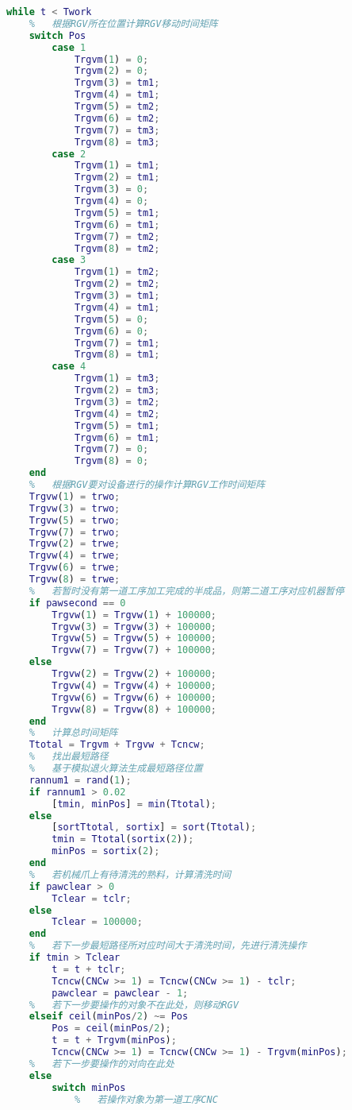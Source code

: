 \documentclass[no-math,withoutpreface,bwprint]{cumcmthesis} %
\numberwithin{equation}{section}
\numberwithin{figure}{section}
\numberwithin{table}{section}
\begin{document}
\begin{lstlisting}[language=matlab]
while t < Twork
    %   根据RGV所在位置计算RGV移动时间矩阵
    switch Pos
        case 1
            Trgvm(1) = 0;
          	Trgvm(2) = 0;
            Trgvm(3) = tm1;
           	Trgvm(4) = tm1;
         	Trgvm(5) = tm2;
           	Trgvm(6) = tm2;
          	Trgvm(7) = tm3;
           	Trgvm(8) = tm3;
       	case 2
           	Trgvm(1) = tm1;
           	Trgvm(2) = tm1;
         	Trgvm(3) = 0;
          	Trgvm(4) = 0;
           	Trgvm(5) = tm1;
          	Trgvm(6) = tm1;
           	Trgvm(7) = tm2;
           	Trgvm(8) = tm2;               
        case 3
           	Trgvm(1) = tm2;
          	Trgvm(2) = tm2;
          	Trgvm(3) = tm1;
         	Trgvm(4) = tm1;
          	Trgvm(5) = 0;
           	Trgvm(6) = 0;
          	Trgvm(7) = tm1;
           	Trgvm(8) = tm1;
     	case 4
         	Trgvm(1) = tm3;
          	Trgvm(2) = tm3;
           	Trgvm(3) = tm2;
          	Trgvm(4) = tm2;
           	Trgvm(5) = tm1;
          	Trgvm(6) = tm1;
        	Trgvm(7) = 0;
           	Trgvm(8) = 0;        
    end
    %   根据RGV要对设备进行的操作计算RGV工作时间矩阵
    Trgvw(1) = trwo;
	Trgvw(3) = trwo;
    Trgvw(5) = trwo;
	Trgvw(7) = trwo;
	Trgvw(2) = trwe;
	Trgvw(4) = trwe;
	Trgvw(6) = trwe;
	Trgvw(8) = trwe;
    %   若暂时没有第一道工序加工完成的半成品，则第二道工序对应机器暂停
    if pawsecond == 0
        Trgvw(1) = Trgvw(1) + 100000;
        Trgvw(3) = Trgvw(3) + 100000;
        Trgvw(5) = Trgvw(5) + 100000;
        Trgvw(7) = Trgvw(7) + 100000;
    else
        Trgvw(2) = Trgvw(2) + 100000;
        Trgvw(4) = Trgvw(4) + 100000;
        Trgvw(6) = Trgvw(6) + 100000;
        Trgvw(8) = Trgvw(8) + 100000;
    end
    %   计算总时间矩阵
    Ttotal = Trgvm + Trgvw + Tcncw;
    %   找出最短路径
    %   基于模拟退火算法生成最短路径位置
    rannum1 = rand(1);
    if rannum1 > 0.02
        [tmin, minPos] = min(Ttotal);
    else
        [sortTtotal, sortix] = sort(Ttotal);
        tmin = Ttotal(sortix(2));
        minPos = sortix(2);
    end
    %   若机械爪上有待清洗的熟料，计算清洗时间
    if pawclear > 0
        Tclear = tclr;
    else
        Tclear = 100000;
    end
    %   若下一步最短路径所对应时间大于清洗时间，先进行清洗操作
    if tmin > Tclear
        t = t + tclr;
        Tcncw(CNCw >= 1) = Tcncw(CNCw >= 1) - tclr;
        pawclear = pawclear - 1;
    %   若下一步要操作的对象不在此处，则移动RGV
    elseif ceil(minPos/2) ~= Pos
        Pos = ceil(minPos/2);
        t = t + Trgvm(minPos);
        Tcncw(CNCw >= 1) = Tcncw(CNCw >= 1) - Trgvm(minPos);
    %   若下一步要操作的对向在此处
    else
        switch minPos
            %   若操作对象为第一道工序CNC

\end{lstlisting}
\end{document}

